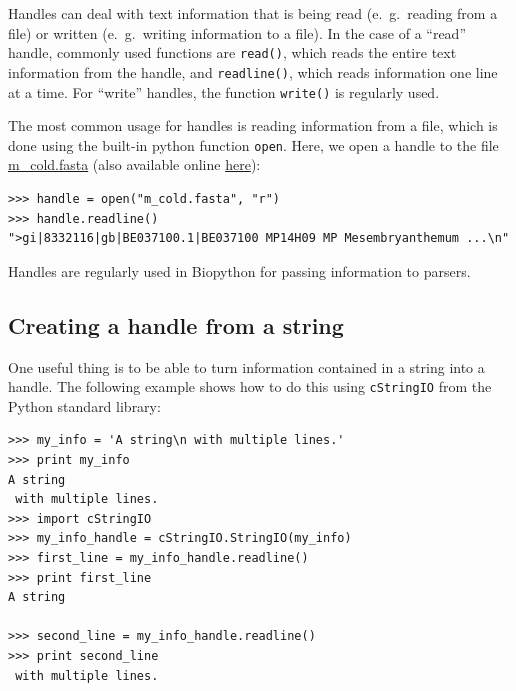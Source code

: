 \documentclass{report}
\begin{document}
Handles can deal with text information that is being read (e.~g.~reading
from a file) or written (e.~g.~writing information to a file). In the
case of a ``read'' handle, commonly used functions are \verb|read()|,
which reads the entire text information from the handle, and
\verb|readline()|, which reads information one line at a time. For
``write'' handles, the function \verb|write()| is regularly used.

The most common usage for handles is reading information from a file,
which is done using the built-in python function \verb|open|. Here, we open a
handle to the file \href{examples/m\_cold.fasta}{m\_cold.fasta}
(also available online
\href{http://biopython.org/DIST/docs/tutorial/examples/m\_cold.fasta}{here}):

\begin{verbatim}
>>> handle = open("m_cold.fasta", "r")
>>> handle.readline()
">gi|8332116|gb|BE037100.1|BE037100 MP14H09 MP Mesembryanthemum ...\n"
\end{verbatim}

Handles are regularly used in Biopython for passing information to parsers.

\subsection{Creating a handle from a string}

One useful thing is to be able to turn information contained in a
string into a handle. The following example shows how to do this using
\verb|cStringIO| from the Python standard library:

\begin{verbatim}
>>> my_info = 'A string\n with multiple lines.'
>>> print my_info
A string
 with multiple lines.
>>> import cStringIO
>>> my_info_handle = cStringIO.StringIO(my_info)
>>> first_line = my_info_handle.readline()
>>> print first_line
A string

>>> second_line = my_info_handle.readline()
>>> print second_line
 with multiple lines.
\end{verbatim}
\end{document}
